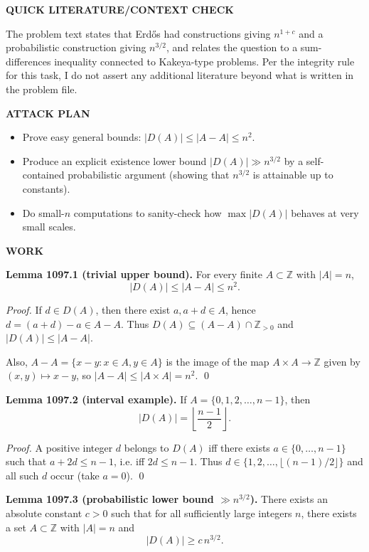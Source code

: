 \medskip
\noindent\textbf{QUICK LITERATURE/CONTEXT CHECK}

\smallskip
\noindent
The problem text states that Erd\H{o}s had constructions giving $n^{1+c}$ and a probabilistic construction giving $n^{3/2}$, and relates the question to a sum-differences inequality connected to Kakeya-type problems. Per the integrity rule for this task, I do not assert any additional literature beyond what is written in the problem file.

\medskip
\noindent\textbf{ATTACK PLAN}

\smallskip
\noindent
\begin{itemize}
\item Prove easy general bounds: $|D(A)|\le |A-A|\le n^2$.
\item Produce an explicit existence lower bound $|D(A)|\gg n^{3/2}$ by a self-contained probabilistic argument (showing that $n^{3/2}$ is attainable up to constants).
\item Do small-$n$ computations to sanity-check how $\max|D(A)|$ behaves at very small scales.
\end{itemize}

\medskip
\noindent\textbf{WORK}

\smallskip
\noindent\textbf{Lemma 1097.1 (trivial upper bound).}
For every finite $A\subset\mathbb{Z}$ with $|A|=n$,
\[
|D(A)|\le |A-A|\le n^2.
\]

\smallskip
\noindent\emph{Proof.}
If $d\in D(A)$, then there exist $a,a+d\in A$, hence $d=(a+d)-a\in A-A$. Thus $D(A)\subseteq (A-A)\cap\mathbb{Z}_{>0}$ and $|D(A)|\le |A-A|$.

Also, $A-A=\{x-y:x\in A,y\in A\}$ is the image of the map $A\times A\to\mathbb{Z}$ given by $(x,y)\mapsto x-y$, so $|A-A|\le |A\times A|=n^2$. \qed

\smallskip
\noindent\textbf{Lemma 1097.2 (interval example).}
If $A=\{0,1,2,\dots,n-1\}$, then
\[
|D(A)|=\left\lfloor\frac{n-1}{2}\right\rfloor.
\]

\smallskip
\noindent\emph{Proof.}
A positive integer $d$ belongs to $D(A)$ iff there exists $a\in\{0,\dots,n-1\}$ such that $a+2d\le n-1$, i.e. iff $2d\le n-1$. Thus $d\in\{1,2,\dots,\lfloor (n-1)/2\rfloor\}$ and all such $d$ occur (take $a=0$). \qed

\smallskip
\noindent\textbf{Lemma 1097.3 (probabilistic lower bound $\gg n^{3/2}$).}
There exists an absolute constant $c>0$ such that for all sufficiently large integers $n$, there exists a set $A\subset\mathbb{Z}$ with $|A|=n$ and
\[
|D(A)|\ge c\,n^{3/2}.
\]


